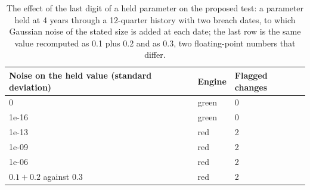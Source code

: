 \begin{table}[htbp]
\centering
\footnotesize
\caption{The effect of the last digit of a held parameter on the proposed test: a parameter held at 4 years through a 12-quarter history with two breach dates, to which Gaussian noise of the stated size is added at each date; the last row is the same value recomputed as 0.1 plus 0.2 and as 0.3, two floating-point numbers that differ.}
\label{tab:last-digit}
\begin{tabular}{lll}
\toprule
Noise on the held value (standard deviation) & Engine & Flagged changes \\
\midrule
0 & green & 0 \\
1e-16 & green & 0 \\
1e-13 & red & 2 \\
1e-09 & red & 2 \\
1e-06 & red & 2 \\
$0.1+0.2$ against $0.3$ & red & 2 \\
\bottomrule
\end{tabular}
\end{table}
